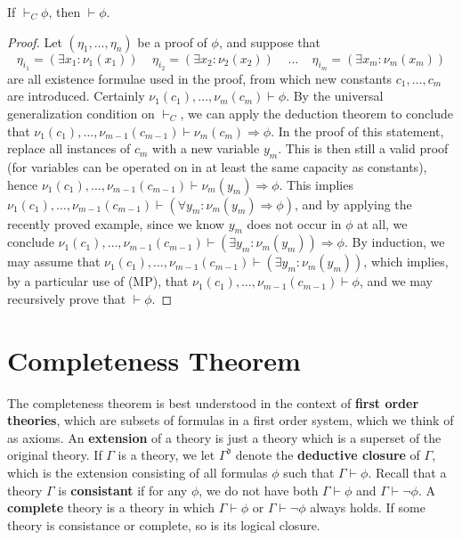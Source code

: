 \begin{theorem}
    If $\vdash_C \phi$, then $\vdash \phi$.
\end{theorem}
\begin{proof}
    Let $(\eta_1, \dots, \eta_n)$ be a proof of $\phi$, and suppose that
    \[ \eta_{i_1} = (\exists x_1: \nu_1(x_1))\ \ \ \ \ \eta_{i_2} = (\exists x_2: \nu_2(x_2))\ \ \ \ \ \dots\ \ \ \ \ \eta_{i_m} = (\exists x_m: \nu_m(x_m)) \]
    are all existence formulae used in the proof, from which new constants $c_1, \dots, c_m$ are introduced. Certainly $\nu_1(c_1), \dots, \nu_m(c_m) \vdash \phi$. By the universal generalization condition on $\vdash_C$, we can apply the deduction theorem to conclude that $\nu_1(c_1), \dots, \nu_{m-1}(c_{m-1}) \vdash \nu_m(c_m) \Rightarrow \phi$. In the proof of this statement, replace all instances of $c_m$ with a new variable $y_m$. This is then still a valid proof (for variables can be operated on in at least the same capacity as constants), hence $\nu_1(c_1), \dots, \nu_{m-1}(c_{m-1}) \vdash \nu_m(y_m) \Rightarrow \phi$. This implies $\nu_1(c_1), \dots, \nu_{m-1}(c_{m-1}) \vdash (\forall y_m: \nu_m(y_m) \Rightarrow \phi)$, and by applying the recently proved example, since we know $y_m$ does not occur in $\phi$ at all, we conclude $\nu_1(c_1), \dots, \nu_{m-1}(c_{m-1}) \vdash (\exists y_m: \nu_m(y_m)) \Rightarrow \phi$. By induction, we may assume that $\nu_1(c_1), \dots, \nu_{m-1}(c_{m-1}) \vdash (\exists y_m: \nu_m(y_m))$, which implies, by a particular use of (MP), that $\nu_1(c_1), \dots, \nu_{m-1}(c_{m-1}) \vdash \phi$, and we may recursively prove that $\vdash \phi$.
\end{proof}

\section{Completeness Theorem}

The completeness theorem is best understood in the context of {\bf first order theories}, which are subsets of formulas in a first order system, which we think of as axioms. An {\bf extension} of a theory is just a theory which is a superset of the original theory. If $\Gamma$ is a theory, we let $\Gamma^{\mathfrak{d}}$ denote the {\bf deductive closure} of $\Gamma$, which is the extension consisting of all formulas $\phi$ such that $\Gamma \vdash \phi$. Recall that a theory $\Gamma$ is {\bf consistant} if for any $\phi$, we do not have both $\Gamma \vdash \phi$ and $\Gamma \vdash \neg \phi$. A {\bf complete} theory is a theory in which $\Gamma \vdash \phi$ or $\Gamma \vdash \neg \phi$ always holds. If some theory is consistance or complete, so is its logical closure.

